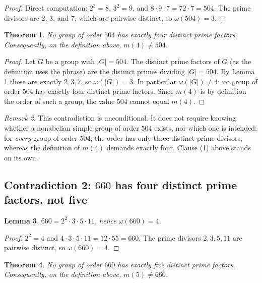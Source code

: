 \documentclass[11pt]{article}
\newtheorem{theorem}{Theorem}
\newtheorem{lemma}[theorem]{Lemma}
\theoremstyle{definition}
\theoremstyle{remark}
\newtheorem{remark}[theorem]{Remark}
\begin{document}
\begin{proof}
Direct computation: $2^{3} = 8$, $3^{2} = 9$, and $8 \cdot 9 \cdot 7 = 72 \cdot 7 =
504$. The prime divisors are $2$, $3$, and $7$, which are pairwise distinct, so
$\omega(504) = 3$.
\end{proof}

\begin{theorem}
No group of order $504$ has exactly four distinct prime factors. Consequently, on the
definition above, $m(4) \ne 504$.
\end{theorem}

\begin{proof}
Let $G$ be a group with $|G| = 504$. The distinct prime factors of $G$ (as the
definition uses the phrase) are the distinct primes dividing $|G| = 504$. By
Lemma 1 these are exactly $2, 3, 7$, so $\omega(|G|) = 3$. In particular
$\omega(|G|) \ne 4$: no group of order $504$ has exactly four distinct prime
factors. Since $m(4)$ is by definition the order of such a group, the value $504$
cannot equal $m(4)$.
\end{proof}

\begin{remark}
This contradiction is unconditional. It does not require knowing whether a
nonabelian simple group of order $504$ exists, nor which one is intended: for
\emph{every} group of order $504$, the order has only three distinct prime divisors,
whereas the definition of $m(4)$ demands exactly four. Clause (1) above stands on
its own.
\end{remark}

\subsection*{Contradiction 2: $660$ has four distinct prime factors, not five}

\begin{lemma}
$660 = 2^{2}\cdot 3 \cdot 5 \cdot 11$, hence $\omega(660) = 4$.
\end{lemma}

\begin{proof}
$2^{2} = 4$ and $4 \cdot 3 \cdot 5 \cdot 11 = 12 \cdot 55 = 660$. The prime divisors
$2, 3, 5, 11$ are pairwise distinct, so $\omega(660) = 4$.
\end{proof}

\begin{theorem}
No group of order $660$ has exactly five distinct prime factors. Consequently, on the
definition above, $m(5) \ne 660$.
\end{theorem}
\end{document}
